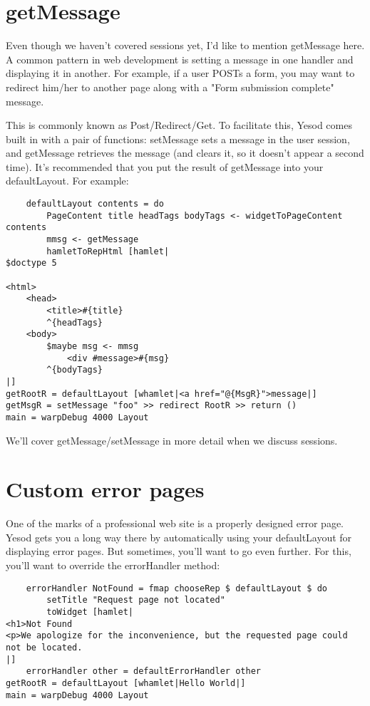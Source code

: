 \section {getMessage}

Even though we haven't covered sessions yet, I'd like to mention getMessage here. A common pattern in web development is setting a message in one handler and displaying it in another. For example, if a user POSTs a form, you may want to redirect him/her to another page along with a "Form submission complete" message.

This is commonly known as Post/Redirect/Get.
To facilitate this, Yesod comes built in with a pair of functions: setMessage sets a message in the user session, and getMessage retrieves the message (and clears it, so it doesn't appear a second time). It's recommended that you put the result of getMessage into your defaultLayout. For example:

\begin{lstlisting}
    defaultLayout contents = do
        PageContent title headTags bodyTags <- widgetToPageContent contents
        mmsg <- getMessage
        hamletToRepHtml [hamlet|
$doctype 5

<html>
    <head>
        <title>#{title}
        ^{headTags}
    <body>
        $maybe msg <- mmsg
            <div #message>#{msg}
        ^{bodyTags}
|]
getRootR = defaultLayout [whamlet|<a href="@{MsgR}">message|]
getMsgR = setMessage "foo" >> redirect RootR >> return ()
main = warpDebug 4000 Layout
\end{lstlisting}%

We'll cover getMessage/setMessage in more detail when we discuss sessions.

\section {Custom error pages}

One of the marks of a professional web site is a properly designed error page. Yesod gets you a long way there by automatically using your defaultLayout for displaying error pages. But sometimes, you'll want to go even further. For this, you'll want to override the errorHandler method:

\begin{lstlisting}
    errorHandler NotFound = fmap chooseRep $ defaultLayout $ do
        setTitle "Request page not located"
        toWidget [hamlet|
<h1>Not Found
<p>We apologize for the inconvenience, but the requested page could not be located.
|]
    errorHandler other = defaultErrorHandler other
getRootR = defaultLayout [whamlet|Hello World|]
main = warpDebug 4000 Layout
\end{lstlisting}

